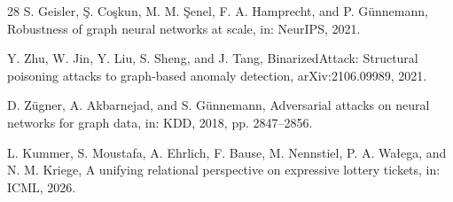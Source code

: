 \documentclass[11pt]{article}
\begin{document}
\begin{thebibliography}{28}
S. Geisler, \c{S}. Co\c{s}kun, M. M. \c{S}enel, F. A. Hamprecht, and P. G\"unnemann, Robustness of graph neural networks at scale, in: NeurIPS, 2021.

Y. Zhu, W. Jin, Y. Liu, S. Sheng, and J. Tang, BinarizedAttack: Structural poisoning attacks to graph-based anomaly detection, arXiv:2106.09989, 2021.

D. Z\"ugner, A. Akbarnejad, and S. G\"unnemann, Adversarial attacks on neural networks for graph data, in: KDD, 2018, pp. 2847--2856.

L. Kummer, S. Moustafa, A. Ehrlich, F. Bause, M. Nennstiel, P. A. Wa\l{e}ga, and N. M. Kriege, A unifying relational perspective on expressive lottery tickets, in: ICML, 2026.

\end{thebibliography}
\end{document}

